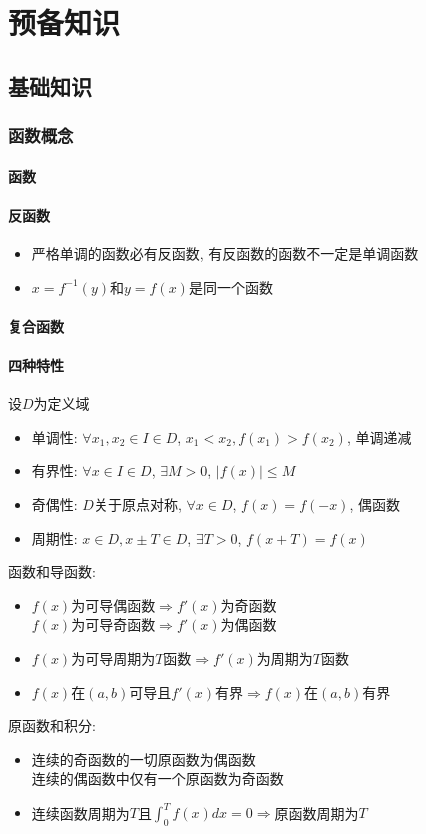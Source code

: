 \chapter{预备知识}
\section{基础知识}
\subsection{函数概念}
\subsubsection{函数}
\subsubsection{反函数}
\begin{itemize}
	\item 严格单调的函数必有反函数, 有反函数的函数不一定是单调函数
    \item $ x=f^{-1}(y) $和$ y=f(x) $是同一个函数
\end{itemize}
\subsubsection{复合函数}
\subsubsection{四种特性}
设$ D $为定义域
\begin{itemize}
	\item 单调性: $ \forall x_{1}, x_{2}\in I \in D $, $ x_{1}<x_{2}, f(x_{1})>f(x_{2}) $, 单调递减
	\item 有界性: $ \forall x\in I \in D $, $ \exists M>0 $, $ |f(x)|\le M $
	\item 奇偶性: $ D $关于原点对称, $ \forall x\in D $, $ f(x)=f(-x) $, 偶函数
	\item 周期性: $ x\in D, x\pm T\in D $, $ \exists T>0 $, $ f(x+T)=f(x) $
\end{itemize}
函数和导函数:
\begin{itemize}
	\item $ f(x) $为可导偶函数$ \Rightarrow f'(x)$为奇函数\\$ f(x) $为可导奇函数$ \Rightarrow f'(x)$为偶函数
	\item $ f(x) $为可导周期为$ T $函数$ \Rightarrow f'(x) $为周期为$ T $函数
	\item $ f(x) $在$ (a,b) $可导且$ f'(x) $有界$ \Rightarrow f(x) $在$ (a,b) $有界
\end{itemize}
原函数和积分:
\begin{itemize}
	\item 连续的奇函数的一切原函数为偶函数\\连续的偶函数中仅有一个原函数为奇函数
	\item 连续函数周期为$ T $且$ \int_{0}^{T}f(x)dx=0 $$ \Rightarrow $原函数周期为$ T $
\end{itemize}
